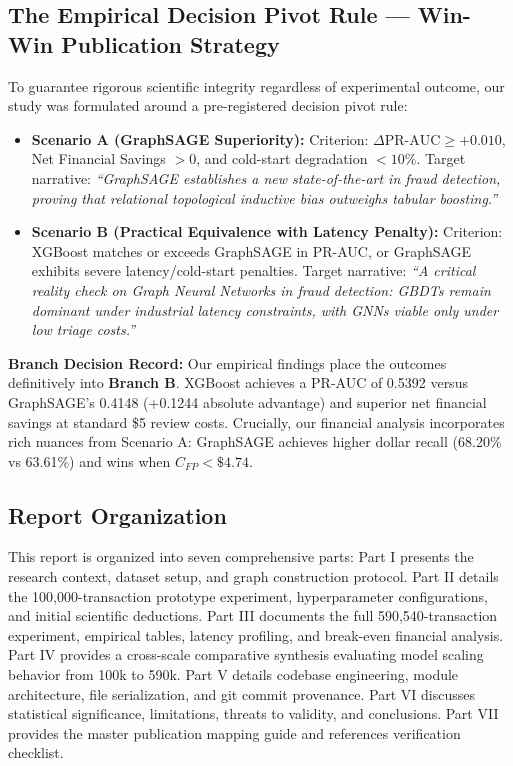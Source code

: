 \documentclass[11pt,a4paper]{report}
\begin{document}
\subsection{The Empirical Decision Pivot Rule --- Win-Win Publication Strategy}
To guarantee rigorous scientific integrity regardless of experimental outcome, our study was formulated around a pre-registered decision pivot rule:
\begin{itemize}
    \item \textbf{Scenario A (GraphSAGE Superiority):} Criterion: $\Delta\text{PR-AUC} \geq +0.010$, Net Financial Savings $> 0$, and cold-start degradation $< 10\%$. Target narrative: \textit{``GraphSAGE establishes a new state-of-the-art in fraud detection, proving that relational topological inductive bias outweighs tabular boosting.''}
    \item \textbf{Scenario B (Practical Equivalence with Latency Penalty):} Criterion: XGBoost matches or exceeds GraphSAGE in PR-AUC, or GraphSAGE exhibits severe latency/cold-start penalties. Target narrative: \textit{``A critical reality check on Graph Neural Networks in fraud detection: GBDTs remain dominant under industrial latency constraints, with GNNs viable only under low triage costs.''}
\end{itemize}
\textbf{Branch Decision Record:} Our empirical findings place the outcomes definitively into \textbf{Branch B}. XGBoost achieves a PR-AUC of 0.5392 versus GraphSAGE's 0.4148 (+0.1244 absolute advantage) and superior net financial savings at standard \$5 review costs. Crucially, our financial analysis incorporates rich nuances from Scenario A: GraphSAGE achieves higher dollar recall (68.20\% vs 63.61\%) and wins when $C_{FP} < \$4.74$.

\subsection{Report Organization}
This report is organized into seven comprehensive parts:
Part I presents the research context, dataset setup, and graph construction protocol.
Part II details the 100,000-transaction prototype experiment, hyperparameter configurations, and initial scientific deductions.
Part III documents the full 590,540-transaction experiment, empirical tables, latency profiling, and break-even financial analysis.
Part IV provides a cross-scale comparative synthesis evaluating model scaling behavior from 100k to 590k.
Part V details codebase engineering, module architecture, file serialization, and git commit provenance.
Part VI discusses statistical significance, limitations, threats to validity, and conclusions.
Part VII provides the master publication mapping guide and references verification checklist.
\end{document}
